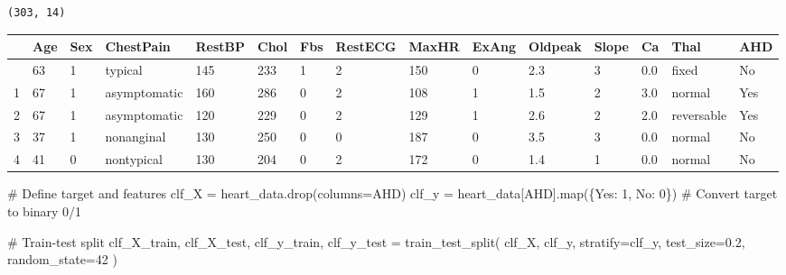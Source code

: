 \documentclass[
  letterpaper,
  DIV=11,
  numbers=noendperiod]{scrreprt}
\newenvironment{Shaded}{\begin{snugshade}}{\end{snugshade}}
\newcommand{\BuiltInTok}[1]{\textcolor[rgb]{0.00,0.23,0.31}{#1}}
\newcommand{\CommentTok}[1]{\textcolor[rgb]{0.37,0.37,0.37}{#1}}
\newcommand{\DecValTok}[1]{\textcolor[rgb]{0.68,0.00,0.00}{#1}}
\newcommand{\FloatTok}[1]{\textcolor[rgb]{0.68,0.00,0.00}{#1}}
\newcommand{\NormalTok}[1]{\textcolor[rgb]{0.00,0.23,0.31}{#1}}
\newcommand{\OperatorTok}[1]{\textcolor[rgb]{0.37,0.37,0.37}{#1}}
\newcommand{\StringTok}[1]{\textcolor[rgb]{0.13,0.47,0.30}{#1}}
\begin{document}
\begin{verbatim}
(303, 14)
\end{verbatim}

\begin{longtable}[]{@{}lllllllllllllll@{}}
\toprule\noalign{}
& Age & Sex & ChestPain & RestBP & Chol & Fbs & RestECG & MaxHR & ExAng
& Oldpeak & Slope & Ca & Thal & AHD \\
\midrule\noalign{}
\endhead
\bottomrule\noalign{}
\endlastfoot
0 & 63 & 1 & typical & 145 & 233 & 1 & 2 & 150 & 0 & 2.3 & 3 & 0.0 &
fixed & No \\
1 & 67 & 1 & asymptomatic & 160 & 286 & 0 & 2 & 108 & 1 & 1.5 & 2 & 3.0
& normal & Yes \\
2 & 67 & 1 & asymptomatic & 120 & 229 & 0 & 2 & 129 & 1 & 2.6 & 2 & 2.0
& reversable & Yes \\
3 & 37 & 1 & nonanginal & 130 & 250 & 0 & 0 & 187 & 0 & 3.5 & 3 & 0.0 &
normal & No \\
4 & 41 & 0 & nontypical & 130 & 204 & 0 & 2 & 172 & 0 & 1.4 & 1 & 0.0 &
normal & No \\
\end{longtable}

\begin{Shaded}
\begin{Highlighting}[]
\CommentTok{\# Define target and features}
\NormalTok{clf\_X }\OperatorTok{=}\NormalTok{ heart\_data.drop(columns}\OperatorTok{=}\StringTok{\textquotesingle{}AHD\textquotesingle{}}\NormalTok{)}
\NormalTok{clf\_y }\OperatorTok{=}\NormalTok{ heart\_data[}\StringTok{\textquotesingle{}AHD\textquotesingle{}}\NormalTok{].}\BuiltInTok{map}\NormalTok{(\{}\StringTok{\textquotesingle{}Yes\textquotesingle{}}\NormalTok{: }\DecValTok{1}\NormalTok{, }\StringTok{\textquotesingle{}No\textquotesingle{}}\NormalTok{: }\DecValTok{0}\NormalTok{\})  }\CommentTok{\# Convert target to binary 0/1}

\CommentTok{\# Train{-}test split}
\NormalTok{clf\_X\_train, clf\_X\_test, clf\_y\_train, clf\_y\_test }\OperatorTok{=}\NormalTok{ train\_test\_split(}
\NormalTok{    clf\_X, clf\_y, stratify}\OperatorTok{=}\NormalTok{clf\_y, test\_size}\OperatorTok{=}\FloatTok{0.2}\NormalTok{, random\_state}\OperatorTok{=}\DecValTok{42}
\NormalTok{)}
\end{Highlighting}
\end{Shaded}
\end{document}

